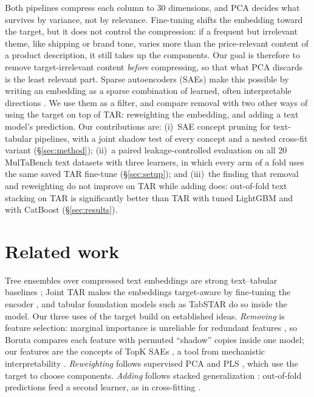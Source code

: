 \documentclass{article}
\begin{document}
Both pipelines compress each column to 30 dimensions, and PCA decides what survives by variance, not by
relevance. Fine-tuning shifts the embedding toward the target, but it does not control the compression: if a frequent
but irrelevant theme, like shipping or brand tone, varies more than the price-relevant content of a product description,
it still takes up the components. Our goal is therefore to remove target-irrelevant content \emph{before}
compressing, so that what PCA discards is the least relevant part. Sparse autoencoders (SAEs) make this possible by
writing an embedding as a sparse combination of learned, often interpretable directions
\citep{bricken2023monosemanticity,cunningham2023sparse,gao2024scaling}. We use them as a filter, and compare removal
with two other ways of using the target on top of TAR: reweighting the embedding, and adding a text model's
prediction. Our contributions are: (i)~SAE concept pruning for text-tabular pipelines, with a joint shadow
test of every concept and a nested cross-fit variant (\S\ref{sec:method}); (ii)~a paired leakage-controlled
evaluation on all 20 MulTaBench text datasets with three learners, in which every arm of a fold uses the same saved
TAR fine-tune (\S\ref{sec:setup}); and (iii)~the finding that removal and reweighting do not improve on TAR while
adding does: out-of-fold text stacking on TAR is significantly better than TAR with tuned LightGBM and with CatBoost
(\S\ref{sec:results}).

\section{Related work}

Tree ensembles over compressed text embeddings are strong text--tabular baselines
\citep{shi2021multimodal,multabench}; Joint TAR makes the embeddings target-aware by fine-tuning the encoder
\citep{multabench}, and tabular foundation models such as TabSTAR \citep{arazi2025tabstar} do so inside the model.
Our three uses of the target build on established ideas. \emph{Removing} is feature selection:
marginal importance is unreliable for redundant features \citep{strobl2008conditional}, so Boruta
\citep{kursa2010boruta} compares each feature with permuted ``shadow'' copies inside one model; our features are the
concepts of TopK SAEs \citep{gao2024scaling}, a tool from mechanistic interpretability
\citep{bricken2023monosemanticity,cunningham2023sparse}. \emph{Reweighting} follows supervised PCA
\citep{bair2006prediction} and PLS \citep{wold2001pls}, which use the target to choose components. \emph{Adding}
follows stacked generalization \citep{wolpert1992stacked}: out-of-fold predictions feed a second learner, as in
cross-fitting \citep{chernozhukov2018double}.
\end{document}
